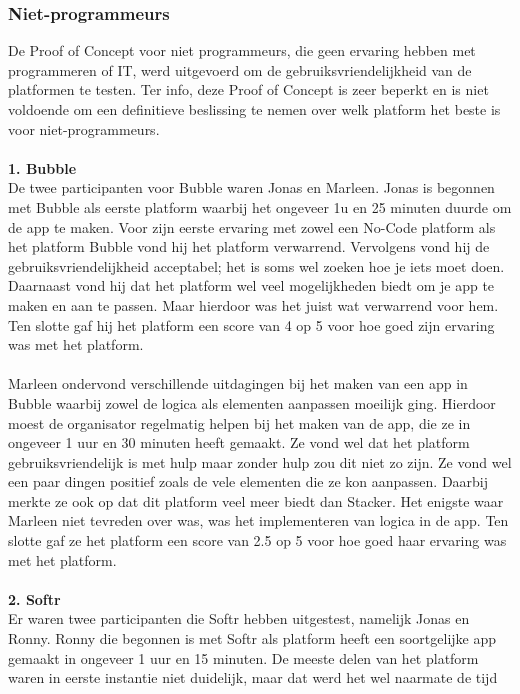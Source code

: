 \subsubsection{Niet-programmeurs}%
\label{subsubsec:niet-programmeurs}
De Proof of Concept voor niet programmeurs, die geen ervaring hebben met programmeren of IT, werd uitgevoerd om 
de gebruiksvriendelijkheid van de platformen te testen. Ter info, deze Proof of Concept is zeer beperkt en is niet voldoende om een definitieve beslissing te nemen over welk platform het beste is voor niet-programmeurs.
\\
\\
\textbf{1. Bubble}
\\
De twee participanten voor Bubble waren Jonas en Marleen. Jonas is begonnen met Bubble als eerste platform waarbij het ongeveer 1u en 25 minuten duurde om de app te maken.
Voor zijn eerste ervaring met zowel een No-Code platform als het platform Bubble vond hij het platform verwarrend. Vervolgens vond hij de gebruiksvriendelijkheid acceptabel; het is soms
wel zoeken hoe je iets moet doen. Daarnaast vond hij dat het platform wel veel mogelijkheden biedt om je app te maken en aan te passen. Maar hierdoor was het juist wat verwarrend voor hem.
Ten slotte gaf hij het platform een score van 4 op 5 voor hoe goed zijn ervaring was met het platform.
\\
\\
Marleen ondervond verschillende uitdagingen bij het maken van een app in Bubble waarbij zowel de logica als elementen aanpassen moeilijk ging. Hierdoor moest de organisator
regelmatig helpen bij het maken van de app, die ze in ongeveer 1 uur en 30 minuten heeft gemaakt. Ze vond wel dat het platform gebruiksvriendelijk is met hulp maar zonder hulp zou dit niet zo zijn. Ze vond wel een paar dingen positief zoals de vele elementen die ze kon aanpassen. Daarbij merkte ze ook op 
dat dit platform veel meer biedt dan Stacker. Het enigste waar Marleen niet tevreden over was, was het implementeren van logica in de app. Ten slotte gaf ze het platform een score van 2.5 op 5 voor hoe goed haar ervaring was met het platform.
\\
\\
\textbf{2. Softr}
\\
Er waren twee participanten die Softr hebben uitgestest, namelijk Jonas en Ronny. Ronny die begonnen is met Softr als platform heeft een soortgelijke app
gemaakt in ongeveer 1 uur en 15 minuten. De meeste delen van het platform waren in eerste instantie niet duidelijk, maar dat werd het wel naarmate de tijd
